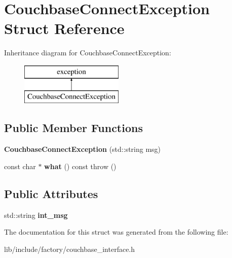 \hypertarget{structCouchbaseConnectException}{\section{Couchbase\-Connect\-Exception Struct Reference}
\label{structCouchbaseConnectException}
}
Inheritance diagram for Couchbase\-Connect\-Exception\-:\begin{figure}[H]
\begin{center}
\leavevmode
\includegraphics[height=2.000000cm]{structCouchbaseConnectException}
\end{center}
\end{figure}
\subsection*{Public Member Functions}
\begin{DoxyCompactItemize}
\item 
\hypertarget{structCouchbaseConnectException_a736ad01618360d2e87cf1ec7e044e1c4}{{\bfseries Couchbase\-Connect\-Exception} (std\-::string msg)}\label{structCouchbaseConnectException_a736ad01618360d2e87cf1ec7e044e1c4}

\item 
\hypertarget{structCouchbaseConnectException_a6a6c10de0766bd4c132538111c78cade}{const char $\ast$ {\bfseries what} () const   throw ()}\label{structCouchbaseConnectException_a6a6c10de0766bd4c132538111c78cade}

\end{DoxyCompactItemize}
\subsection*{Public Attributes}
\begin{DoxyCompactItemize}
\item 
\hypertarget{structCouchbaseConnectException_a23038f9bf06ec009f0b3c3ac22812415}{std\-::string {\bfseries int\-\_\-msg}}\label{structCouchbaseConnectException_a23038f9bf06ec009f0b3c3ac22812415}

\end{DoxyCompactItemize}


The documentation for this struct was generated from the following file\-:\begin{DoxyCompactItemize}
\item 
lib/include/factory/couchbase\-\_\-interface.\-h\end{DoxyCompactItemize}
